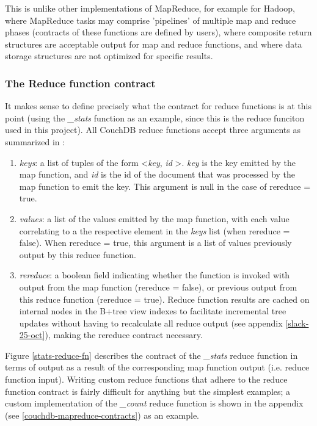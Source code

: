 This is unlike other implementations of MapReduce, for example for Hadoop, where MapReduce tasks may comprise 'pipelines' of multiple map and reduce phases (contracts of these functions are defined by users), where composite return structures are acceptable output for map and reduce functions, and where data storage structures are not optimized for specific results.

\subsubsection{The Reduce function contract}
It makes sense to define precisely what the contract for reduce functions is at this point (using the \textit{\_stats} function as an example, since this is the reduce funciton used in this project). All CouchDB reduce functions accept three arguments as summarized in \cite{reduceFunctions}:

\begin{enumerate}
    \item \textit{keys}: a list of tuples of the form \textless \textit{key}, \textit{id} \textgreater. \textit{key} is the key emitted by the map function, and \textit{id} is the id of the document that was processed by the map function to emit the key. This argument is null in the case of rereduce = true.
    \item \textit{values}: a list of the values emitted by the map function, with each value correlating to a the respective element in the \textit{keys} list (when rereduce = false). When rereduce = true, this argument is a list of values previously output by this reduce function.
    \item \textit{rereduce}: a boolean field indicating whether the function is invoked with output from the map function (rereduce = false), or previous output from this reduce function (rereduce = true). Reduce function results are cached on internal nodes in the B+tree view indexes to facilitate incremental tree updates without having to recalculate all reduce output (see appendix \ref{slack-25-oct}), making the rereduce contract necessary.
\end{enumerate}

Figure \ref{stats-reduce-fn} describes the contract of the \textit{\_stats} reduce function in terms of output as a result of the corresponding map function output (i.e. reduce function input). Writing custom reduce functions that adhere to the reduce function contract is fairly difficult for anything but the simplest examples; a custom implementation of the \textit{\_count} reduce function is shown in the appendix (see \ref{couchdb-mapreduce-contracts}) as an example.

